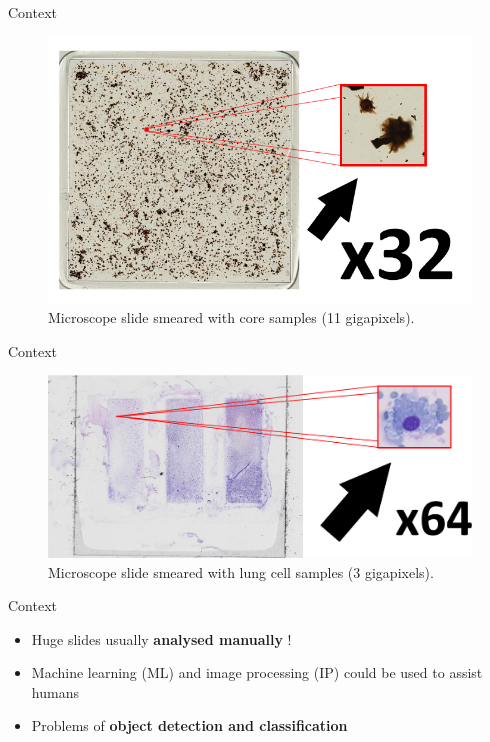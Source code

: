 \documentclass{beamer}
\begin{document}
\begin{frame}{Context}
	\vfill
	\begin{figure}[h]
	\center
	\includegraphics[scale=0.95]{images/whole-slide-geo-2.png}
	\caption{Microscope slide smeared with core samples (11 gigapixels).}
	\end{figure}
	\vfill
\end{frame}

\begin{frame}{Context}
	\vfill
	\begin{figure}[h]
	\center
	\includegraphics[scale=0.78]{images/whole-slide-lung-2.png}
	\caption{Microscope slide smeared with lung cell samples (3 gigapixels).}
	\end{figure}
	\vfill
\end{frame}

\begin{frame}{Context}
	\begin{itemize}
		\item Huge slides usually \textbf{analysed manually} !
		\item Machine learning (ML) and image processing (IP) could be used to assist humans
		\item Problems of \textbf{object detection and classification}
	\end{itemize}
\end{frame}
\end{document}
